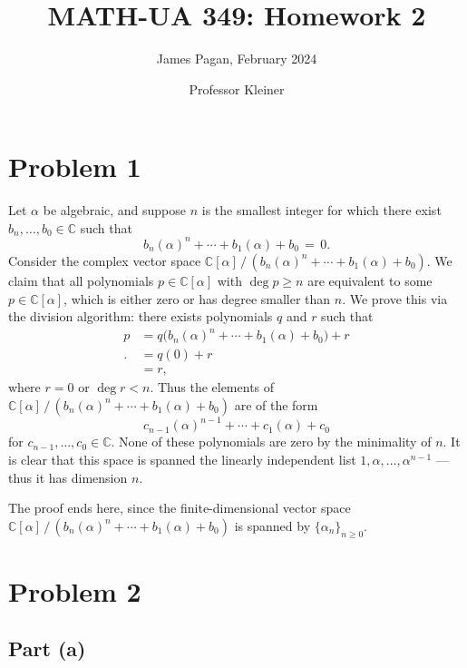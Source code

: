 \documentclass[11pt]{article}
\title{MATH-UA 349: Homework 2}
\author{James Pagan, February 2024}
\date{Professor Kleiner}
\begin{document}
\maketitle
\tableofcontents
\newpage


\section{Problem 1}

Let $\alpha$ be algebraic, and suppose $n$ is the smallest integer for which there exist $b_{n}, \ldots, b_{0} \in \mathbb{C}$ such that
\[
  b_{n} (\alpha)^{n} + \cdots + b_{1} (\alpha) + b_{0} \, = \, 0.
\]
Consider the complex vector space $\mathbb{C}[\alpha] \, / \, (b_{n} (\alpha)^{n} + \cdots + b_{1}(\alpha) + b_{0})$. We claim that all polynomials $p \in \mathbb{C}[\alpha]$ with $\deg p \ge n$ are equivalent to some $p \in \mathbb{C}[\alpha]$, which is either zero or has degree smaller than $n$. We prove this via the division algorithm: there exists polynomials $q$ and $r$ such that
\begin{align*}
  p &= q \big( b_{n} (\alpha)^{n} + \cdots + b_{1} (\alpha) + b_{0} \big) + r  \\.
    &= q(0) + r \\
    &= r,
\end{align*}
where $r = 0$ or $\deg r < n$. Thus the elements of $\mathbb{C}[\alpha] \, / \, (b_{n} (\alpha)^{n} + \cdots + b_{1}(\alpha) + b_{0})$ are of the form
\[
  c_{n - 1} (\alpha)^{n - 1} + \cdots + c_{1} (\alpha) + c_{0}
\]
for $c_{n - 1}, \ldots, c_{0} \in \mathbb{C}$. None of these polynomials are zero by the minimality of $n$. It is clear that this space is spanned the linearly independent list $1, \alpha, \ldots, \alpha^{n - 1}$ --- thus it has dimension $n$. 

The proof ends here, since the finite-dimensional vector space $\mathbb{C}[\alpha] \, / \, (b_{n} (\alpha)^{n} + \cdots + b_{1}(\alpha) + b_{0})$ is spanned by $\{ \alpha_{n} \}_{n \ge 0}$.


\section{Problem 2}


\subsection*{Part (a)}
\end{document}
